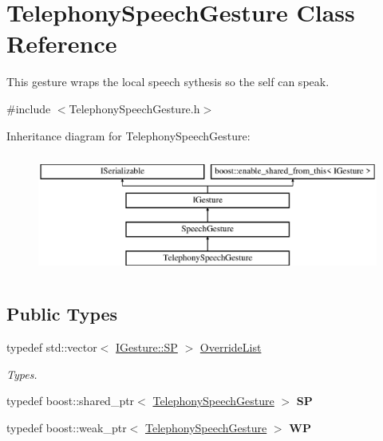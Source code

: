 \hypertarget{class_telephony_speech_gesture}{}\section{Telephony\+Speech\+Gesture Class Reference}
\label{class_telephony_speech_gesture}


This gesture wraps the local speech sythesis so the self can speak.  




{\ttfamily \#include $<$Telephony\+Speech\+Gesture.\+h$>$}

Inheritance diagram for Telephony\+Speech\+Gesture\+:\begin{figure}[H]
\begin{center}
\leavevmode
\includegraphics[height=4.000000cm]{class_telephony_speech_gesture}
\end{center}
\end{figure}
\subsection*{Public Types}
\begin{DoxyCompactItemize}
\item 
\mbox{\label{class_telephony_speech_gesture_a75bae581794350b70a4656b698c83f6e}} 
typedef std\+::vector$<$ \hyperlink{class_i_gesture_a4455e468c21c82736bb3ec97c1c72158}{I\+Gesture\+::\+SP} $>$ \hyperlink{class_telephony_speech_gesture_a75bae581794350b70a4656b698c83f6e}{Override\+List}
\begin{DoxyCompactList}\small\item\em Types. \end{DoxyCompactList}\item 
\mbox{\label{class_telephony_speech_gesture_a7bfd87cedaad2b2abc822bd31678cd54}} 
typedef boost\+::shared\+\_\+ptr$<$ \hyperlink{class_telephony_speech_gesture}{Telephony\+Speech\+Gesture} $>$ {\bfseries SP}
\item 
\mbox{\label{class_telephony_speech_gesture_a56deb08f41fb91dbe4651a7b3e588c2b}} 
typedef boost\+::weak\+\_\+ptr$<$ \hyperlink{class_telephony_speech_gesture}{Telephony\+Speech\+Gesture} $>$ {\bfseries WP}
\end{DoxyCompactItemize}
